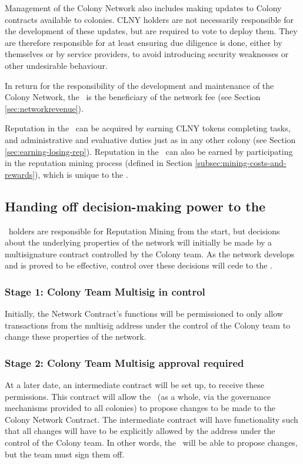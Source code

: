 Management of the Colony Network also includes making updates to Colony contracts available to colonies. CLNY holders are not necessarily responsible for the development of these updates, but are required to vote to deploy them. They are therefore responsible for at least ensuring due diligence is done, either by themselves or by service providers, to avoid introducing security weaknesses or other undesirable behaviour.

In return for the responsibility of the development and maintenance of the Colony Network, the \rc\ is the beneficiary of the network fee (see Section \ref{sec:networkrevenue}).

Reputation in the \rc\ can be acquired by earning CLNY tokens completing tasks, and administrative and evaluative duties just as in any other colony (see Section \ref{sec:earning-losing-rep}). Reputation in the \rc\ can also be earned by participating in the reputation mining process (defined in Section \ref{subsec:mining-costs-and-rewards}), which is unique to the \rc.

\subsection{Handing off decision-making power to the \rc}\label{subsec:ceding-control-to-rc}
\rct\ holders are responsible for Reputation Mining from the start, but decisions about the underlying properties of the network will initially be made by a multisignature contract controlled by the Colony team. As the network develops and is proved to be effective, control over these decisions will cede to the \rc.

\subsubsection*{Stage 1: Colony Team Multisig in control}
 Initially, the Network Contract's functions will be permissioned to only allow transactions from the multisig address under the control of the Colony team to change these properties of the network.

\subsubsection*{Stage 2: Colony Team Multisig approval required}
At a later date, an intermediate contract will be set up, to receive these permissions. This contract will allow the \rc\ (as a whole, via the governance mechanisms provided to all colonies) to propose changes to be made to the Colony Network Contract. The intermediate contract will have functionality such that all changes will have to be explicitly allowed by the address under the control of the Colony team. In other words, the \rc\ will be able to propose changes, but the team must sign them off.

